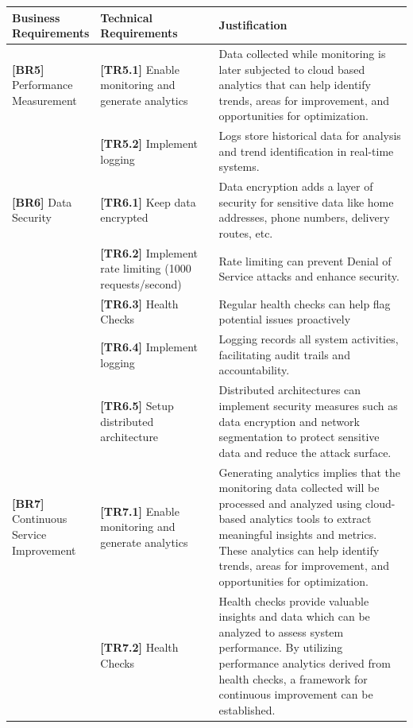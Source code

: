 \documentclass{article}
\begin{document}
\begin{table}[H]
    \centering
    \def\arraystretch{1.75}
    \begin{tabular}{|p{0.2\linewidth}| p{0.3\linewidth} | p{0.5\linewidth} |} \hline 
         \textbf{Business Requirements} &  \textbf{Technical Requirements} & \textbf{Justification}\\ \hline 
            \textbf{[BR5]} Performance Measurement&  \textbf{[TR5.1]} Enable monitoring and generate analytics & Data collected while monitoring is later subjected to cloud based analytics that can help identify trends, areas for improvement, and opportunities for optimization.\\ \hline
         &  \textbf{[TR5.2]} Implement logging & Logs store historical data for analysis and trend identification in real-time systems. \cite{Logging}  \\ \hline
         \textbf{[BR6]} Data Security&  \textbf{[TR6.1]} Keep data encrypted & Data encryption adds a layer of security for sensitive data like home addresses, phone numbers, delivery routes, etc. \cite{Encryption} \\ \hline
         &  \textbf{[TR6.2]} Implement rate limiting (1000 requests/second)& Rate limiting can prevent Denial of Service attacks and enhance security.\\ \hline
         &  \textbf{[TR6.3]} Health Checks & Regular health checks can help flag potential issues proactively \cite{Health check} \\ \hline
         &  \textbf{[TR6.4]} Implement logging & Logging records all system activities, facilitating audit trails and accountability. \cite{Logging}\\ \hline
         &  \textbf{[TR6.5]} Setup distributed architecture & Distributed architectures can implement security measures such as data encryption and network segmentation to protect sensitive data and reduce the attack surface. \\ \hline
         \textbf{[BR7]} Continuous Service Improvement&  \textbf{[TR7.1]} Enable monitoring and generate analytics& Generating analytics implies that the monitoring data collected will be processed and analyzed using cloud-based analytics tools to extract meaningful insights and metrics. These analytics can help identify trends, areas for improvement, and opportunities for optimization.\\ \hline
         &  \textbf{[TR7.2]} Health Checks & Health checks provide valuable insights and data which can be analyzed to assess system performance. By utilizing performance analytics derived from health checks, a framework for continuous improvement can be established. \cite{Health check}\\ \hline

\end{tabular}
\end{table}
\end{document}
